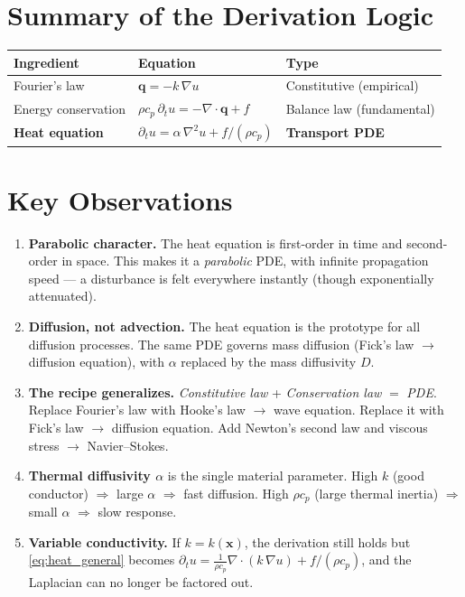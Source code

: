 \documentclass[11pt]{article}
\newcommand{\divergence}{\nabla\!\cdot\!}
\begin{document}
\section{Summary of the Derivation Logic}

\begin{center}
\renewcommand{\arraystretch}{1.5}
\begin{tabular}{l|l|l}
  \hline
  \textbf{Ingredient} & \textbf{Equation} & \textbf{Type} \\
  \hline
  Fourier's law & $\mathbf{q} = -k\,\nabla u$ & Constitutive (empirical) \\
  Energy conservation & $\rho c_p\,\partial_t u = -\divergence\mathbf{q} + f$ & Balance law (fundamental) \\
  \hline
  \textbf{Heat equation} & $\partial_t u = \alpha\,\nabla^2 u + f/(\rho c_p)$ & \textbf{Transport PDE} \\
  \hline
\end{tabular}
\end{center}

\section{Key Observations}

\begin{enumerate}
  \item \textbf{Parabolic character.}
    The heat equation is first-order in time and second-order in space.
    This makes it a \emph{parabolic} PDE, with infinite propagation speed ---
    a disturbance is felt everywhere instantly (though exponentially attenuated).

  \item \textbf{Diffusion, not advection.}
    The heat equation is the prototype for all diffusion processes.
    The same PDE governs mass diffusion (Fick's law $\to$ diffusion equation),
    with $\alpha$ replaced by the mass diffusivity $D$.

  \item \textbf{The recipe generalizes.}
    \emph{Constitutive law} + \emph{Conservation law} $=$ \emph{PDE}.
    Replace Fourier's law with Hooke's law $\to$ wave equation.
    Replace it with Fick's law $\to$ diffusion equation.
    Add Newton's second law and viscous stress $\to$ Navier--Stokes.

  \item \textbf{Thermal diffusivity $\alpha$} is the single material parameter.
    High $k$ (good conductor) $\Rightarrow$ large $\alpha$ $\Rightarrow$ fast diffusion.
    High $\rho c_p$ (large thermal inertia) $\Rightarrow$ small $\alpha$ $\Rightarrow$ slow response.

  \item \textbf{Variable conductivity.}
    If $k = k(\mathbf{x})$, the derivation still holds but \eqref{eq:heat_general} becomes
    $\partial_t u = \frac{1}{\rho c_p}\divergence(k\,\nabla u) + f/(\rho c_p)$,
    and the Laplacian can no longer be factored out.
\end{enumerate}
\end{document}
